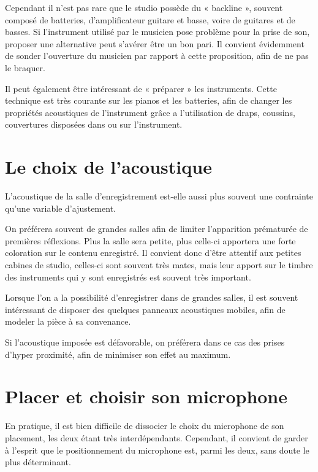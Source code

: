 \documentclass[
  letterpaper,
  DIV=11,
  numbers=noendperiod]{scrreprt}
\begin{document}
Cependant il n'est pas rare que le studio possède du « backline »,
souvent composé de batteries, d'amplificateur guitare et basse, voire de
guitares et de basses. Si l'instrument utilisé par le musicien pose
problème pour la prise de son, proposer une alternative peut s'avérer
être un bon pari. Il convient évidemment de sonder l'ouverture du
musicien par rapport à cette proposition, afin de ne pas le braquer.

Il peut également être intéressant de « préparer » les instruments.
Cette technique est très courante sur les pianos et les batteries, afin
de changer les propriétés acoustiques de l'instrument grâce a
l'utilisation de draps, coussins, couvertures disposées dans ou sur
l'instrument.

\hypertarget{le-choix-de-lacoustique}{%
\section{Le choix de l'acoustique}\label{le-choix-de-lacoustique}}

L'acoustique de la salle d'enregistrement est-elle aussi plus souvent
une contrainte qu'une variable d'ajustement.

On préférera souvent de grandes salles afin de limiter l'apparition
prématurée de premières réflexions. Plus la salle sera petite, plus
celle-ci apportera une forte coloration sur le contenu enregistré. Il
convient donc d'être attentif aux petites cabines de studio, celles-ci
sont souvent très mates, mais leur apport sur le timbre des instruments
qui y sont enregistrés est souvent très important.

Lorsque l'on a la possibilité d'enregistrer dans de grandes salles, il
est souvent intéressant de disposer des quelques panneaux acoustiques
mobiles, afin de modeler la pièce à sa convenance.

Si l'acoustique imposée est défavorable, on préférera dans ce cas des
prises d'hyper proximité, afin de minimiser son effet au maximum.

\hypertarget{placer-et-choisir-son-microphone}{%
\section{Placer et choisir son
microphone}\label{placer-et-choisir-son-microphone}}

En pratique, il est bien difficile de dissocier le choix du microphone
de son placement, les deux étant très interdépendants. Cependant, il
convient de garder à l'esprit que le positionnement du microphone est,
parmi les deux, sans doute le plus déterminant.
\end{document}
